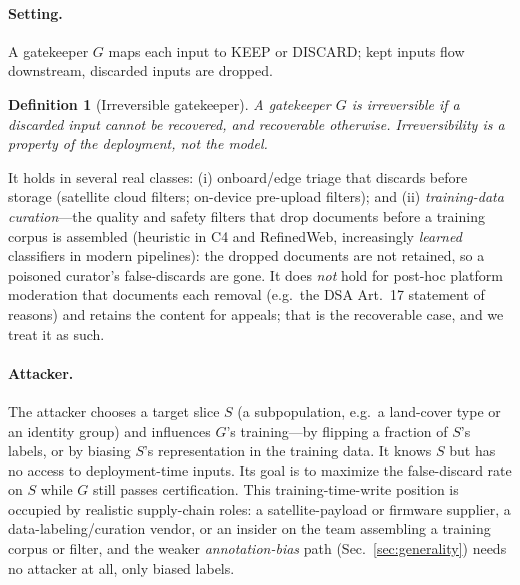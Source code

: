 \documentclass[conference]{IEEEtran}
\newtheorem{definition}{Definition}
\begin{document}
\paragraph{Setting.} A gatekeeper $G$ maps each input to KEEP or DISCARD; kept inputs flow downstream, discarded
inputs are dropped.
\begin{definition}[Irreversible gatekeeper]\label{def:irrev}
A gatekeeper $G$ is \emph{irreversible} if a discarded input cannot be recovered, and \emph{recoverable}
otherwise. Irreversibility is a property of the deployment, not the model.
\end{definition}
\noindent It holds in several real classes:
(i) onboard/edge triage that discards before storage (satellite cloud filters; on-device pre-upload filters);
and (ii) \emph{training-data curation}---the quality and safety filters that drop documents before a
training corpus is assembled (heuristic in C4 and RefinedWeb, increasingly \emph{learned} classifiers in modern
pipelines): the dropped documents are not
retained, so a poisoned curator's false-discards are gone. It does \emph{not} hold for post-hoc platform
moderation that documents each removal (e.g.\ the DSA Art.~17 statement of reasons) and retains the content for
appeals; that is the recoverable case, and we treat it as such.

\paragraph{Attacker.} The attacker chooses a target slice $S$ (a subpopulation, e.g.\ a land-cover type or an
identity group) and influences $G$'s training---by flipping a fraction of $S$'s labels, or by biasing $S$'s
representation in the training data. It knows $S$ but has no access to deployment-time inputs. Its goal is to
maximize the false-discard rate on $S$ while $G$ still passes certification. This training-time-write position
is occupied by realistic supply-chain roles: a satellite-payload or firmware supplier, a data-labeling/curation
vendor, or an insider on the team assembling a training corpus or filter, and the weaker \emph{annotation-bias}
path (Sec.~\ref{sec:generality}) needs no attacker at all, only biased labels.
\end{document}
